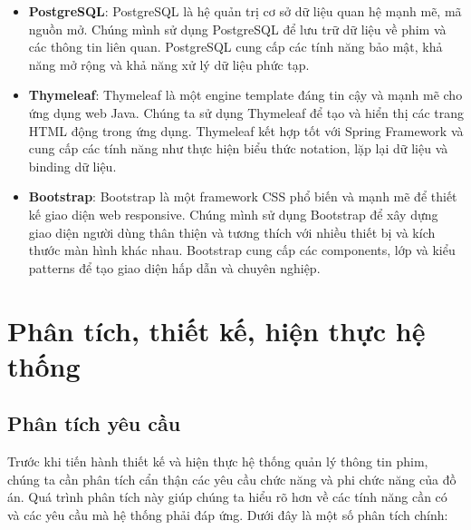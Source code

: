 \documentclass[12pt]{article}
\begin{document}
\begin{itemize}
    \item \textbf{PostgreSQL}: PostgreSQL là hệ quản trị cơ sở dữ liệu quan hệ mạnh mẽ, mã nguồn mở. Chúng mình sử dụng PostgreSQL để lưu trữ dữ liệu về phim và các thông tin liên quan. PostgreSQL cung cấp các tính năng bảo mật, khả năng mở rộng và khả năng xử lý dữ liệu phức tạp.
    \item \textbf{Thymeleaf}: Thymeleaf là một engine template đáng tin cậy và mạnh mẽ cho ứng dụng web Java. Chúng ta sử dụng Thymeleaf để tạo và hiển thị các trang HTML động trong ứng dụng. Thymeleaf kết hợp tốt với Spring Framework và cung cấp các tính năng như thực hiện biểu thức notation, lặp lại dữ liệu và binding dữ liệu.
    \item \textbf{Bootstrap}: Bootstrap là một framework CSS phổ biến và mạnh mẽ để thiết kế giao diện web responsive. Chúng mình sử dụng Bootstrap để xây dựng giao diện người dùng thân thiện và tương thích với nhiều thiết bị và kích thước màn hình khác nhau. Bootstrap cung cấp các components, lớp và kiểu patterns để tạo giao diện hấp dẫn và chuyên nghiệp.
\end{itemize}
\section{Phân tích, thiết kế, hiện thực hệ thống}
\subsection{Phân tích yêu cầu}
Trước khi tiến hành thiết kế và hiện thực hệ thống quản lý thông tin phim, chúng ta cần phân tích cẩn thận các yêu cầu chức năng và phi chức năng của đồ án. Quá trình phân tích này giúp chúng ta hiểu rõ hơn về các tính năng cần có và các yêu cầu mà hệ thống phải đáp ứng. Dưới đây là một số phân tích chính:
\end{document}
